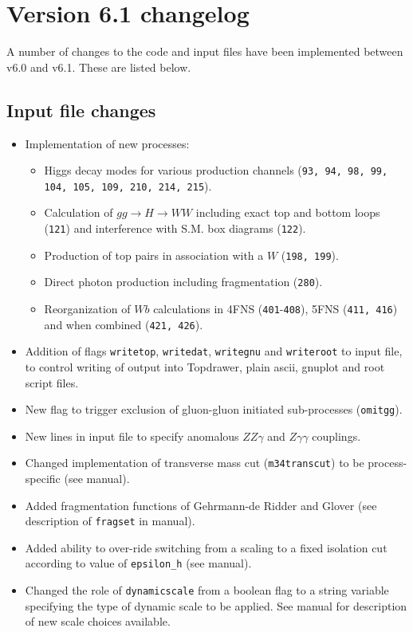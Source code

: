 \documentclass[12pt]{article}
\begin{document}
\section{Version 6.1 changelog}
\label{changelog}

A number of changes to the code and input files have been implemented
between v6.0 and v6.1. These are listed below.

\subsection{Input file changes}
\begin{itemize}
\item Implementation of new processes:
\begin{itemize}
\item Higgs decay modes for various
production channels ({\tt 93, 94, 98, 99, 104, 105, 109, 210, 214, 215}).
\item Calculation of $gg \to H \to WW$ including exact top and bottom loops ({\tt 121})
and interference with S.M. box diagrams ({\tt 122}).
\item Production of top pairs in association with a $W$ ({\tt 198, 199}).
\item Direct photon production including fragmentation ({\tt 280}).
\item Reorganization of $Wb$ calculations in
4FNS ({\tt 401}-{\tt 408}), 5FNS ({\tt 411, 416}) and when combined
({\tt 421, 426}).
\end{itemize}
\item Addition of flags {\tt writetop}, {\tt writedat}, {\tt writegnu}
and {\tt writeroot} to input file, to control writing of output into Topdrawer,
plain ascii, gnuplot and root script files.
\item New flag to trigger exclusion of gluon-gluon initiated  sub-processes
({\tt omitgg}).
\item New lines in input file to specify anomalous $ZZ\gamma$
and $Z\gamma\gamma$ couplings.
\item Changed implementation of transverse mass cut ({\tt m34transcut})
to be process-specific (see manual).
\item Added fragmentation functions of Gehrmann-de Ridder and Glover
(see description of {\tt fragset} in manual).
\item Added ability to over-ride switching from a scaling to a fixed isolation
cut according to value of {\tt epsilon\_h} (see manual).
\item Changed the role of {\tt dynamicscale} from a boolean flag to a string
variable specifying the type of dynamic scale to be applied. See manual
for description of new scale choices available.
\end{itemize}
\end{document}
